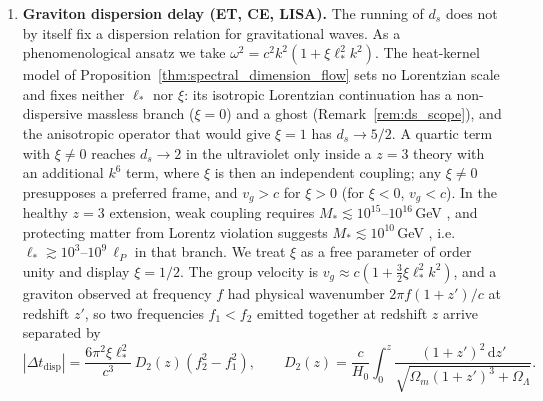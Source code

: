 \documentclass[11pt,a4paper,reqno]{amsart}
\theoremstyle{definition}
\numberwithin{equation}{section}
\newcommand{\dif}{\,\mathrm{d}}
\begin{document}
\begin{enumerate}[label=(\roman*),leftmargin=1.8em]
    \item \textbf{Graviton dispersion delay (ET, CE, LISA).} The running of $d_s$ does not by itself fix a dispersion relation for gravitational waves. As a phenomenological ansatz we take $\omega^2 = c^2 k^2 (1 + \xi \ell_\ast^2 k^2)$. The heat-kernel model of Proposition~\ref{thm:spectral_dimension_flow} sets no Lorentzian scale and fixes neither $\ell_\ast$ nor $\xi$: its isotropic Lorentzian continuation has a non-dispersive massless branch ($\xi = 0$) and a ghost (Remark~\ref{rem:ds_scope}), and the anisotropic operator that would give $\xi = 1$ has $d_s \to 5/2$. A quartic term with $\xi \neq 0$ reaches $d_s \to 2$ in the ultraviolet only inside a $z = 3$ theory with an additional $k^6$ term, where $\xi$ is then an independent coupling; any $\xi \neq 0$ presupposes a preferred frame, and $v_g > c$ for $\xi > 0$ (for $\xi < 0$, $v_g < c$). In the healthy $z = 3$ extension, weak coupling requires $M_\ast \lesssim 10^{15}$--$10^{16}$\,GeV \cite{blas2011models}, and protecting matter from Lorentz violation suggests $M_\ast \lesssim 10^{10}$\,GeV \cite{pospelov2012lorentz}, i.e.\ $\ell_\ast \gtrsim 10^3$--$10^9\,\ell_P$ in that branch. We treat $\xi$ as a free parameter of order unity and display $\xi = 1/2$. The group velocity is $v_g \approx c(1 + \frac{3}{2}\xi \ell_\ast^2 k^2)$, and a graviton observed at frequency $f$ had physical wavenumber $2\pi f(1+z')/c$ at redshift $z'$, so two frequencies $f_1 < f_2$ emitted together at redshift $z$ arrive separated by \cite{jacob2008lorentz, mirshekari2012constraining}
    \begin{equation}
        \label{eq:delta_t}
        |\Delta t_{\mathrm{disp}}| = \frac{6\pi^2 \xi \ell_\ast^2}{c^3}\, D_2(z) \left(f_2^2 - f_1^2\right), \qquad D_2(z) = \frac{c}{H_0} \int_0^z \frac{(1+z')^2 \dif z'}{\sqrt{\Omega_m(1+z')^3 + \Omega_\Lambda}}.
    \end{equation}

\end{enumerate}
\end{document}
